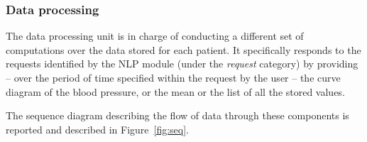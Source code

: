 



\subsubsection{Data processing}

The data processing unit is in charge of conducting a different set of computations over the data stored for each patient.
%
It specifically responds to the requests identified by the NLP module (under the \emph{request} category) by providing -- over the period of time specified within the request by the user -- the curve diagram of the blood pressure, or the mean or the list of all the stored values.

\vspace{5pt}
\noindent The sequence diagram describing the flow of data through these components is reported and described in Figure~\ref{fig:seq}.

